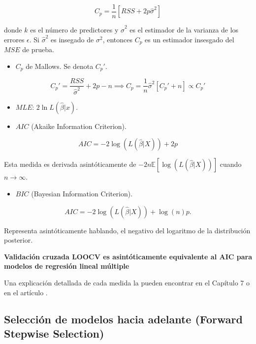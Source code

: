 \documentclass[
  12pt,
]{book}
\providecommand{\tightlist}{%
  \setlength{\itemsep}{0pt}\setlength{\parskip}{0pt}}
\theoremstyle{definition}
\theoremstyle{definition}
\theoremstyle{definition}
\theoremstyle{remark}
\begin{document}
\[ C_p = \dfrac{1}{n}\left[RSS+2p\hat\sigma^2\right]\]

donde \(k\) es el número de predictores y \(\hat\sigma^2\) es el estimador de la varianza de los errores \(\epsilon\). Si \(\hat\sigma^2\) es insegado de \(\sigma^2\), entonces \(C_p\) es un estimador insesgado del \(MSE\) de prueba.

\begin{itemize}
\tightlist
\item
  \(C_p\) de Mallows. Se denota \(C_p'\).
\end{itemize}

\[ C_p' = \dfrac{RSS}{\hat\sigma^2} + 2p-n \implies C_p = \dfrac1n\hat\sigma^2[C_p'+n] \propto C_p'\]

\begin{itemize}
\item
  \(MLE\): \(2\ln L(\hat{\beta} | x)\).
\item
  \(AIC\) (Akaike Information Criterion).
\end{itemize}

\[
AIC = -2\log(L(\hat{\beta} \vert X)) + 2p 
\]

Esta medida es derivada asintóticamente de \(-2n\mathbb{E}[\log(L(\hat{\beta} \vert X))]\) cuando \(n\to \infty\).

\begin{itemize}
\tightlist
\item
  \(BIC\) (Bayesian Information Criterion).
\end{itemize}

\[
AIC = -2\log(L(\hat{\beta} \vert X)) + \log(n)p. 
\]

Representa asintóticamente hablando, el negativo del logaritmo de la distribución posterior.

\textbf{Validación cruzada LOOCV es asintóticamente equivalente al AIC para modelos de regresión lineal múltiple \autocite{StoneAsymptotic1977}}

Una explicación detallada de cada medida la pueden encontrar en el Capítulo 7 \autocite{Hastie2009a} o en el artículo \autocite{CavanaughAkaike2019}.

\hypertarget{selecciuxf3n-de-modelos-hacia-adelante-forward-stepwise-selection}{%
\subsection{\texorpdfstring{Selección de modelos hacia adelante (\textbf{Forward Stepwise Selection})}{Selección de modelos hacia adelante (Forward Stepwise Selection)}}\label{selecciuxf3n-de-modelos-hacia-adelante-forward-stepwise-selection}}
\end{document}
